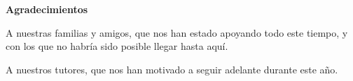
\newpage
\begin{center}
{\bf \Huge Agradecimientos}
\end{center}
\vspace{1cm}
\setlength{\baselineskip}{0.8cm}



A nuestras familias y amigos, que nos han estado apoyando todo este tiempo, y con los que no habría sido posible llegar hasta aquí.

A nuestros tutores, que nos han motivado a seguir adelante durante este año.

